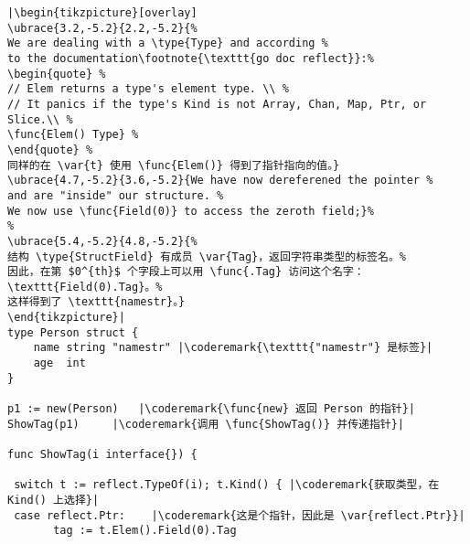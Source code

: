 \begin{lstlisting}[caption=使用反射自省,label=src:introspection]
|\begin{tikzpicture}[overlay]
\ubrace{3.2,-5.2}{2.2,-5.2}{%
We are dealing with a \type{Type} and according %
to the documentation\footnote{\texttt{go doc reflect}}:%
\begin{quote} %
// Elem returns a type's element type. \\ %
// It panics if the type's Kind is not Array, Chan, Map, Ptr, or Slice.\\ %
\func{Elem() Type} %
\end{quote} %
同样的在 \var{t} 使用 \func{Elem()} 得到了指针指向的值。}
\ubrace{4.7,-5.2}{3.6,-5.2}{We have now dereferened the pointer %
and are "inside" our structure. %
We now use \func{Field(0)} to access the zeroth field;}%
%
\ubrace{5.4,-5.2}{4.8,-5.2}{%
结构 \type{StructField} 有成员 \var{Tag}，返回字符串类型的标签名。%
因此，在第 $0^{th}$ 个字段上可以用 \func{.Tag} 访问这个名字：\texttt{Field(0).Tag}。%
这样得到了 \texttt{namestr}。}
\end{tikzpicture}|
type Person struct {
    name string "namestr" |\coderemark{\texttt{"namestr"} 是标签}|
    age  int
}

p1 := new(Person)   |\coderemark{\func{new} 返回 Person 的指针}|
ShowTag(p1)	    |\coderemark{调用 \func{ShowTag()} 并传递指针}|

func ShowTag(i interface{}) {

 switch t := reflect.TypeOf(i); t.Kind() { |\coderemark{获取类型，在 Kind() 上选择}|
 case reflect.Ptr:	  |\coderemark{这是个指针，因此是 \var{reflect.Ptr}}|
       tag := t.Elem().Field(0).Tag
\end{lstlisting}
